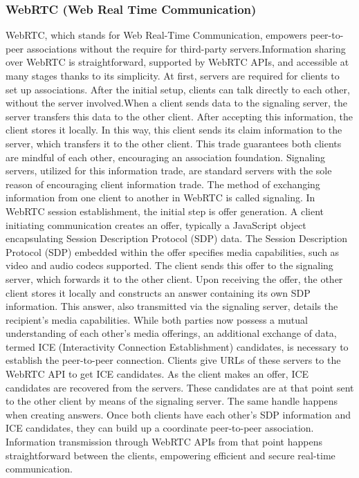 \documentclass[a4paper,12pt]{article}  %
\begin{document}
\subsubsection{WebRTC (Web Real Time Communication)}
WebRTC, which stands for Web Real-Time Communication, empowers peer-to-peer
associations without the require for third-party servers.Information sharing
over WebRTC is straightforward, supported by WebRTC APIs, and accessible at
many stages thanks to its simplicity. At first, servers are required for
clients to set up associations. After the initial setup, clients can talk
directly to each other, without the server involved.When a client sends data to
the signaling server, the server transfers this data to the other client. After
accepting this information, the client stores it locally. In this way, this
client sends its claim information to the server, which transfers it to the
other client. This trade guarantees both clients are mindful of each other,
encouraging an association foundation. Signaling servers, utilized for this
information trade, are standard servers with the sole reason of encouraging
client information trade.\cite{emmanuel2022design} The method of exchanging
information from one client to another in WebRTC is called signaling. In WebRTC
session establishment, the initial step is offer generation. A client
initiating communication creates an offer, typically a JavaScript object
encapsulating Session Description Protocol (SDP) data. The Session Description
Protocol (SDP) embedded within the offer specifies media capabilities, such as
video and audio codecs supported. The client sends this offer to the signaling
server, which forwards it to the other client. Upon receiving the offer, the
other client stores it locally and constructs an answer containing its own SDP
information. This answer, also transmitted via the signaling server, details
the recipient's media capabilities. While both parties now possess a mutual
understanding of each other's media offerings, an additional exchange of data,
termed ICE (Interactivity Connection Establishment) candidates, is necessary to
establish the peer-to-peer connection. Clients give URLs of these servers to
the WebRTC API to get ICE candidates. As the client makes an offer, ICE
candidates are recovered from the servers. These candidates are at that point
sent to the other client by means of the signaling server. The same handle
happens when creating answers. Once both clients have each other's SDP
information and ICE candidates, they can build up a coordinate peer-to-peer
association. Information transmission through WebRTC APIs from that point
happens straightforward between the clients, empowering efficient and secure
real-time communication.\\
\end{document}
